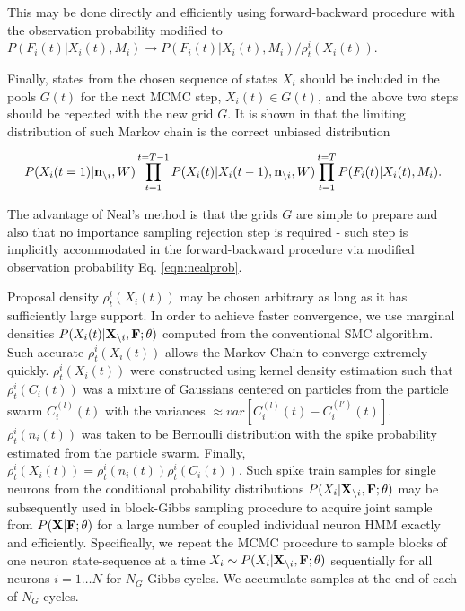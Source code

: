 This may be done directly and efficiently using forward-backward procedure with the observation probability modified to $P(F_i(t)|X_i(t), M_i)\rightarrow P(F_i(t)|X_i(t), M_i)/{\rho^i_t(X_i(t))}$.

Finally, states from the chosen sequence of states $X_i$ should be included in the pools $G(t)$ for the next MCMC step, $X_i(t)\in G(t)$, and the above two steps should be repeated with the new grid $G$. It is shown in \cite{NBR03} that the limiting distribution of such Markov chain is the correct unbiased distribution

\begin{equation}
P(X_i(t=1)|{\bf n}_{\backslash i}, W)\prod\limits_{t=1}^{t=T-1}P(X_i(t)|X_i(t-1), {\bf n}_{\backslash i}, W)\prod\limits_{t=1}^{t=T}P(F_i(t)|X_i(t), M_i).
\end{equation}

The advantage of Neal's method is that the grids $G$ are simple to prepare and also that no importance sampling rejection step is required - such step is implicitly accommodated in the forward-backward procedure via modified observation probability Eq. \eqref{eqn:nealprob}.

Proposal density $\rho^i_t(X_i(t))$ may be chosen arbitrary as long as it has sufficiently large support.  In order to achieve faster convergence, we use marginal densities $P(X_i(t)|{\bf X}_{\backslash i}, \bf F; \theta)$ computed from the conventional SMC algorithm. Such accurate $\rho^i_t(X_i(t))$ allows the Markov Chain to converge extremely quickly.  $\rho^i_t(X_i(t))$ were constructed using kernel density estimation such that $\rho^i_t(C_i(t))$ was a mixture of Gaussians centered on particles from the particle swarm $C_i^{(l)}(t)$ with the variances $\approx var\left[C_i^{(l)}(t)-C_i^{(l')}(t) \right]$. $\rho^i_t(n_i(t))$ was taken to be Bernoulli distribution with the spike probability estimated from the particle swarm. Finally, $\rho^i_t(X_i(t)) = \rho^i_t(n_i(t)) \rho^i_t(C_i(t))$.  Such spike train samples for single neurons from the conditional probability distributions $P(X_i|{\bf X}_{\backslash i}, \bf F; \theta)$ may be subsequently used in block-Gibbs sampling procedure to acquire joint sample from $P({\bf X}| {\bf F}; \theta)$ for a large number of coupled individual neuron HMM exactly and efficiently.  Specifically, we repeat the MCMC procedure to sample blocks of one neuron state-sequence at a time $X_i\sim P(X_{i}|{\bf X}_{\backslash i},{\bf F}; \theta)$ sequentially for all neurons $i=1\ldots N$ for $N_G$ Gibbs cycles.  We accumulate samples at the end of each of $N_G$ cycles.

